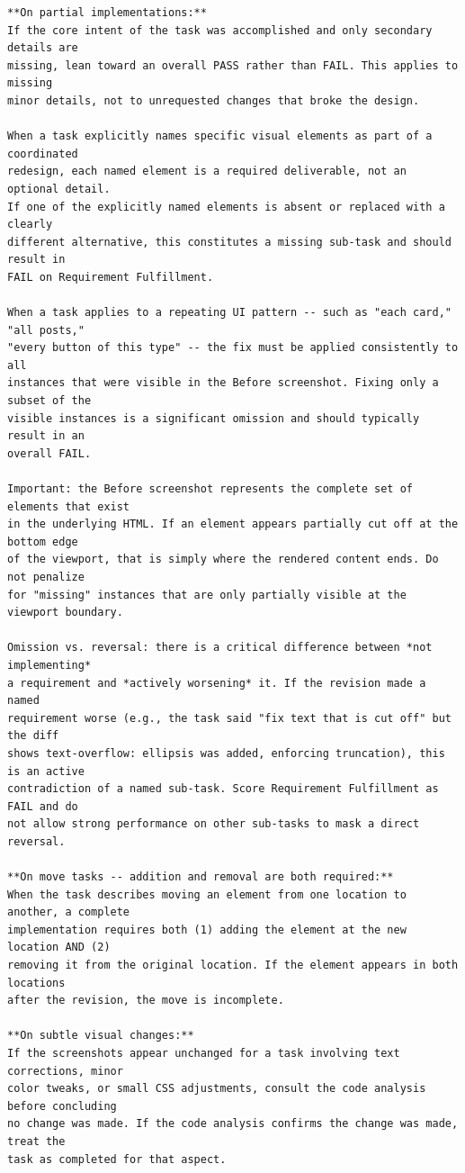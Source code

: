 \documentclass[sigconf,nonacm]{acmart}
\begin{document}
\begin{mdframed}[style=promptbox]
\begin{lstlisting}[basicstyle=\scriptsize\ttfamily, breaklines=true, breakatwhitespace=true,
                   xleftmargin=0pt, xrightmargin=0pt]
**On partial implementations:**
If the core intent of the task was accomplished and only secondary details are
missing, lean toward an overall PASS rather than FAIL. This applies to missing
minor details, not to unrequested changes that broke the design.

When a task explicitly names specific visual elements as part of a coordinated
redesign, each named element is a required deliverable, not an optional detail.
If one of the explicitly named elements is absent or replaced with a clearly
different alternative, this constitutes a missing sub-task and should result in
FAIL on Requirement Fulfillment.

When a task applies to a repeating UI pattern -- such as "each card," "all posts,"
"every button of this type" -- the fix must be applied consistently to all
instances that were visible in the Before screenshot. Fixing only a subset of the
visible instances is a significant omission and should typically result in an
overall FAIL.

Important: the Before screenshot represents the complete set of elements that exist
in the underlying HTML. If an element appears partially cut off at the bottom edge
of the viewport, that is simply where the rendered content ends. Do not penalize
for "missing" instances that are only partially visible at the viewport boundary.

Omission vs. reversal: there is a critical difference between *not implementing*
a requirement and *actively worsening* it. If the revision made a named
requirement worse (e.g., the task said "fix text that is cut off" but the diff
shows text-overflow: ellipsis was added, enforcing truncation), this is an active
contradiction of a named sub-task. Score Requirement Fulfillment as FAIL and do
not allow strong performance on other sub-tasks to mask a direct reversal.

**On move tasks -- addition and removal are both required:**
When the task describes moving an element from one location to another, a complete
implementation requires both (1) adding the element at the new location AND (2)
removing it from the original location. If the element appears in both locations
after the revision, the move is incomplete.

**On subtle visual changes:**
If the screenshots appear unchanged for a task involving text corrections, minor
color tweaks, or small CSS adjustments, consult the code analysis before concluding
no change was made. If the code analysis confirms the change was made, treat the
task as completed for that aspect.


\end{lstlisting}
\end{mdframed}
\end{document}
